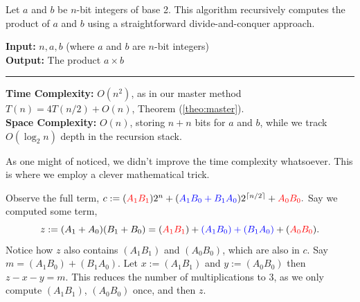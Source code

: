 \begin{Func}
    Let $a$ and $b$ be $n$-bit integers of base 2. This algorithm recursively computes the product of $a$ and $b$ using a straightforward divide-and-conquer approach.

    \vspace{.5em}
    \noindent
    \textbf{Input:} $n, a, b$ (where $a$ and $b$ are $n$-bit integers)\\
    \textbf{Output:} The product $a \times b$\\

    \begin{algorithm}[H]
        \SetAlgoLined
    \end{algorithm}
    \noindent\rule{\textwidth}{0.4pt}

    \noindent
    \textbf{Time Complexity:} $O(n^2)$, as in our master method $T(n)=4T(n/2)+O(n)$, Theorem (\ref{theo:master}).\\
    \textbf{Space Complexity:} $O(n)$, storing $n+n$ bits for $a$ and $b$, while we track $O(\log_2 n)$ depth in the recursion stack.
\end{Func}


\noindent
As one might of noticed, we didn't improve the time complexity whatsoever. This is where we employ a clever mathematical trick.
\newpage

\label{page:karatsuba}
\noindent
Observe the full term, $c:=(\textcolor{red}{A_1B_1})2^{n}+(\textcolor{blue}{A_1B_0+B_1A_0})2^{\lceil n/2\rceil}+\textcolor{red}{A_0B_0}.$ Say we computed some term,
\[z:=(A_1+A_0)(B_1+B_0)=(\textcolor{red}{A_1B_1})+\textcolor{blue}{(A_1B_0)+(B_1A_0)}+(\textcolor{red}{A_0B_0}).\]
\noindent
Notice how $z$ also contains $(A_1B_1)$ and $(A_0B_0)$, which are also in $c$. Say
$m=(A_1B_0)+(B_1A_0)$. Let $x:=(A_1B_1)$ and $y:=(A_0B_0)$ then $z-x-y=m$. This reduces the number of multiplications to 3, as we only compute
 $(A_1B_1)$, $(A_0B_0)$ once, and then $z$.\\


